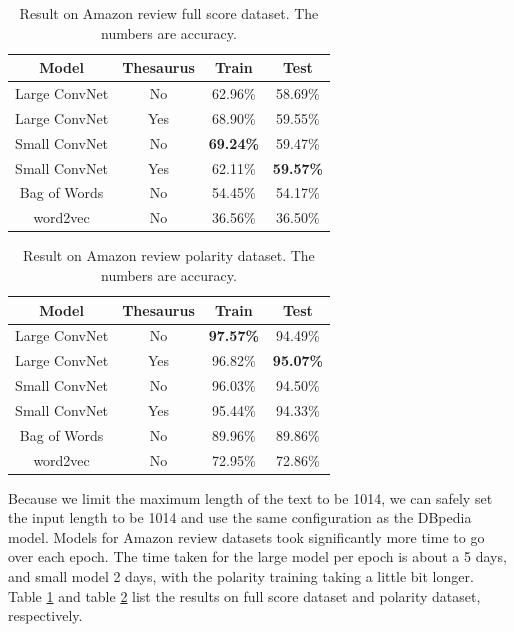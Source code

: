 \documentclass{article}
\begin{document}
\begin{CJK}{UTF8}{gbsn}
\begin{table}[ht]
  \caption{Result on Amazon review full score dataset. The numbers are accuracy.}
  \label{tab:amzr}
  \begin{center}
    \begin{tabular}{cccc}
      \hline
      \abovespace\belowspace
      Model & Thesaurus & Train & Test  \\
      \hline
      \abovespace
      Large ConvNet & No & 62.96\% & 58.69\% \\
      Large ConvNet & Yes & 68.90\% & 59.55\% \\
      Small ConvNet & No & \textbf{69.24\%} & 59.47\% \\
      Small ConvNet & Yes & 62.11\% & \textbf{59.57\%} \\
      Bag of Words & No & 54.45\% & 54.17\% \\
      \belowspace
      word2vec & No & 36.56\% & 36.50\% \\
      \hline
    \end{tabular}
  \end{center}
\end{table}

\begin{table}[ht]
  \caption{Result on Amazon review polarity dataset. The numbers are accuracy.}
  \label{tab:amzp}
  \begin{center}
    \begin{tabular}{cccc}
      \hline
      \abovespace\belowspace
      Model & Thesaurus & Train & Test  \\
      \hline
      \abovespace
      Large ConvNet & No & \textbf{97.57\%} & 94.49\% \\
      Large ConvNet & Yes & 96.82\% & \textbf{95.07\%} \\
      Small ConvNet & No & 96.03\% & 94.50\% \\
      Small ConvNet & Yes & 95.44\% & 94.33\% \\
      Bag of Words & No & 89.96\% & 89.86\% \\
      \belowspace
      word2vec & No & 72.95\% & 72.86\% \\
      \hline
    \end{tabular}
  \end{center}
\end{table}

Because we limit the maximum length of the text to be 1014, we can safely set the input length to be 1014 and use the same configuration as the DBpedia model. Models for Amazon review datasets took significantly more time to go over each epoch. The time taken for the large model per epoch is about a 5 days, and small model 2 days, with the polarity training taking a little bit longer. Table \ref{tab:amzr} and table \ref{tab:amzp} list the results on full score dataset and polarity dataset, respectively.


\end{CJK}
\end{document}
